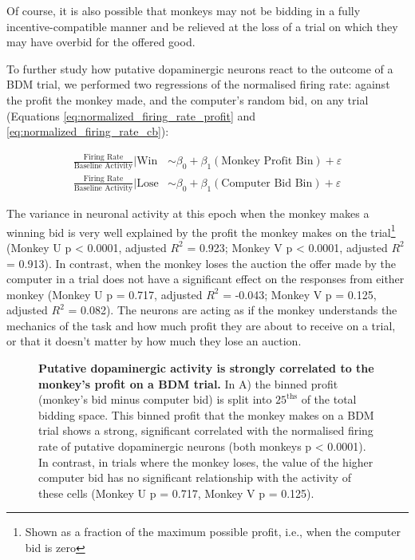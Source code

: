 Of course, it is also possible that monkeys may not be bidding in a fully incentive-compatible manner and be relieved at the loss of a trial on which they may have overbid for the offered good.

To further study how putative dopaminergic neurons react to the outcome of a BDM trial, we performed two regressions of the normalised firing rate: against the profit the monkey made, and the computer's random bid, on any trial (Equations \ref{eq:normalized_firing_rate_profit} and \ref{eq:normalized_firing_rate_cb}):

\begin{align}
\frac{\text{Firing Rate}}{\text{Baseline Activity}} | \text{Win} &\sim \beta_0 + \beta_1(\text{Monkey Profit Bin}) + \varepsilon \label{eq:normalized_firing_rate_profit}\\
\frac{\text{Firing Rate}}{\text{Baseline Activity}} | \text{Lose} &\sim \beta_0 + \beta_1(\text{Computer Bid Bin}) + \varepsilon \label{eq:normalized_firing_rate_cb}
\end{align}

The variance in neuronal activity at this epoch when the monkey makes a winning bid is very well explained by the profit the monkey makes on the trial\footnote{Shown as a fraction of the maximum possible profit, i.e., when the computer bid is zero} (Monkey U p < 0.0001, adjusted $R^2$ = 0.923; Monkey V p < 0.0001, adjusted $R^2$ = 0.913). In contrast, when the monkey loses the auction the offer made by the computer in a trial does not have a significant effect on the responses from either monkey (Monkey U p = 0.717, adjusted $R^2$ = -0.043; Monkey V p = 0.125, adjusted $R^2$ = 0.082). The neurons are acting as if the monkey understands the mechanics of the task and how much profit they are about to receive on a trial, or that it doesn't matter by how much they lose an auction.

\begin{figure}[htbp!] 
\centering    

\caption[Putative dopaminergic activity is strongly correlated to the monkey's profit on a BDM trial.]{\textbf{Putative dopaminergic activity is strongly correlated to the monkey's profit on a BDM trial.} In A) the binned profit (monkey's bid minus computer bid) is split into $25^{\text{ths}}$ of the total bidding space. This binned profit that the monkey makes on a BDM trial shows a strong, significant correlated with the normalised firing rate of putative dopaminergic neurons (both monkeys p < 0.0001). In contrast, in trials where the monkey loses, the value of the higher computer bid has no significant relationship with the activity of these cells (Monkey U p = 0.717, Monkey V p = 0.125).}
\label{fig:winlose_profit_regression}
\end{figure}

